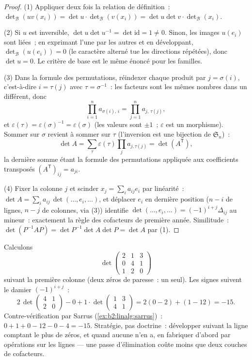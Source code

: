\begin{proof}
(1) Appliquer deux fois la relation de définition~:
$\det_{\mathcal B}(uv(x_i)) = \det u \cdot \det_{\mathcal
B}(v(x_i)) = \det u \det v \cdot \det_{\mathcal B}(x_i)$.

(2) Si $u$ est inversible, $\det u \det u^{-1} = \det \mathrm{id} =
1 \neq 0$. Sinon, les images $u(e_i)$ sont liées~; en exprimant l'une
par les autres et en développant, $\det_{\mathcal B}(u(e_i)) = 0$
(le caractère alterné tue les directions répétées), donc $\det u = 0$.
Le critère de base est le même énoncé pour les familles.

(3) Dans la formule des permutations, réindexer chaque produit par $j =
\sigma(i)$, c'est-à-dire $i = \tau(j)$ avec $\tau = \sigma^{-1}$~: les
facteurs sont les mêmes nombres dans un  différent, donc
\[
\prod_{i=1}^{n} a_{\sigma(i),\,i} = \prod_{j=1}^{n}
a_{j,\,\tau(j)} ,
\]
et $\varepsilon(\tau) = \varepsilon(\sigma)^{-1} =
\varepsilon(\sigma)$ (les valeurs sont $\pm1$~; $\varepsilon$ est un
morphisme). Sommer sur $\sigma$ revient à sommer sur $\tau$
(l'inversion est une bijection de $\mathfrak{S}_n$)~:
\[
\det A = \sum_{\tau}\varepsilon(\tau)\prod_j a_{j,\tau(j)}
= \det(A^{\mathsf T}),
\]
la dernière somme étant la formule des permutations appliquée aux
coefficients transposés $(A^{\mathsf T})_{ij} = a_{ji}$.

(4) Fixer la colonne $j$ et scinder $x_j = \sum_i a_{ij} e_i$ par
linéarité~: $\det A = \sum_i a_{ij}\, \det(\dots, e_i, \dots)$, et
déplacer $e_i$ en dernière position ($n - i$  de lignes,
$n - j$ de colonnes, via (3)) identifie $\det(\dots, e_i, \dots) =
(-1)^{i+j}\Delta_{ij}$ au mineur~: exactement la règle des cofacteurs
de première année. Similitude~: $\det(P^{-1}AP) = \det P^{-1}\det A \det P =
\det A$ par (1).
\end{proof}

\begin{example}\label{ex:b2:linalg:cofactorwork}
Calculons
\[
\det\begin{pmatrix}
2 & 1 & 3\\
0 & 4 & 1\\
1 & 2 & 0
\end{pmatrix}
\]
suivant la première colonne (deux zéros de paresse~: un seul).
Les signes suivent le damier $(-1)^{i+j}$~:
\[
2\,\det\begin{pmatrix}4 & 1\\ 2 & 0\end{pmatrix}
- 0
+ 1\cdot\det\begin{pmatrix}1 & 3\\ 4 & 1\end{pmatrix}
= 2(0 - 2) + (1 - 12) = -15 .
\]
Contre-vérification par Sarrus (\cref{ex:b2:linalg:sarrus})~: $0 + 1 + 0
- 12 - 0 - 4 = -15$. Stratégie, pas doctrine~: développer suivant la
ligne comptant le plus de zéros, et quand aucune n'en a, en fabriquer
d'abord par opérations sur les lignes --- une passe d'élimination coûte
moins que deux couches de cofacteurs.
\end{example}

